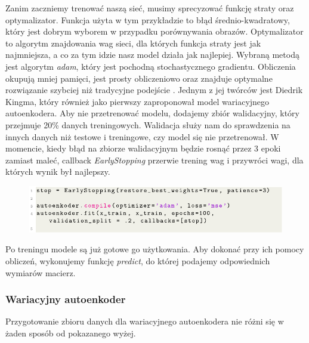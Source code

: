 \documentclass[a4paper,12pt,oneside]{book} %
\begin{document}
Zanim zaczniemy trenować naszą sieć, musimy sprecyzować funkcję straty oraz optymalizator. Funkcja użyta w tym przykładzie to błąd średnio-kwadratowy, który jest dobrym wyborem w przypadku porównywania obrazów. Optymalizator to algorytm znajdowania wag sieci, dla których funkcja straty jest jak najmniejsza, a co za tym idzie nasz model działa jak najlepiej. Wybraną metodą jest algorytm \textit{adam}, który jest pochodną stochastycznego gradientu. Obliczenia okupują mniej pamięci, jest prosty obliczeniowo oraz znajduje optymalne rozwiązanie szybciej niż tradycyjne podejście \cite{adam}. Jednym z jej twórców jest Diedrik Kingma, który również jako pierwszy zaproponował model wariacyjnego autoenkodera. Aby nie przetrenować modelu, dodajemy zbiór walidacyjny, który przejmuje 20\% danych treningowych. Walidacja służy nam do sprawdzenia na innych danych niż testowe i treningowe, czy model się nie przetrenował. W momencie, kiedy błąd na zbiorze walidacyjnym będzie rosnąć przez 3 epoki zamiast maleć, callback \textit{EarlyStopping} przerwie trening wag i przywróci wagi, dla których wynik był najlepszy.
\begin{figure}[h!]
	\centering
	\includegraphics[width=\linewidth]{trainae.pdf}
\end{figure}

Po treningu modele są już gotowe go użytkowania. Aby dokonać przy ich pomocy obliczeń, wykonujemy funkcję \textit{predict}, do której podajemy odpowiednich wymiarów macierz. 
\subsubsection{Wariacyjny autoenkoder}
Przygotowanie zbioru danych dla wariacyjnego autoenkodera nie różni się w żaden sposób od pokazanego wyżej. 
\end{document}
